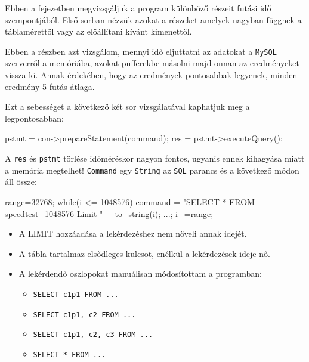 
Ebben a fejezetben megvizsgáljuk a program különböző részeit futási idő szempontjából. Első sorban nézzük azokat a részeket amelyek nagyban függnek a táblamérettől vagy az előállítani kívánt kimenettől.  


Ebben a részben azt vizsgálom, mennyi idő eljuttatni az adatokat a \texttt{MySQL} szerverről a memóriába, azokat pufferekbe másolni majd onnan az eredményeket vissza ki.
Annak érdekében, hogy az eredmények pontosabbak legyenek, minden eredmény 5 futás átlaga.

Ezt a sebességet a következő két sor vizsgálatával kaphatjuk meg a legpontosabban:
\begin{python}
pstmt = con->prepareStatement(command);
res = pstmt->executeQuery();
\end{python}
A  \texttt{res} és \texttt{pstmt} törlése időméréskor nagyon fontos, ugyanis ennek kihagyása miatt a memória megtelhet!
\texttt{Command} egy \texttt{String} az \texttt{SQL} parancs és a következő módon áll össze:
\begin{python}
range=32768;
while(i <= 1048576){
   command = "SELECT * FROM speedtest_1048576 Limit "  + to_string(i);
   ...; i+=range; }
\end{python}

\begin{itemize}
\item A LIMIT hozzáadása a lekérdezéshez nem növeli annak idejét.
\item A tábla tartalmaz elsődleges kulcsot, enélkül a lekérdezések ideje nő.
\item A lekérdendő oszlopokat manuálisan módosítottam a programban: 
\begin{itemize} 
\item \texttt{SELECT c1p1 FROM ...}
\item \texttt{SELECT c1p1, c2 FROM ...} 
\item \texttt{SELECT c1p1, c2, c3 FROM ...} 
\item \texttt{SELECT * FROM ...} 
\end{itemize}
\end{itemize}

